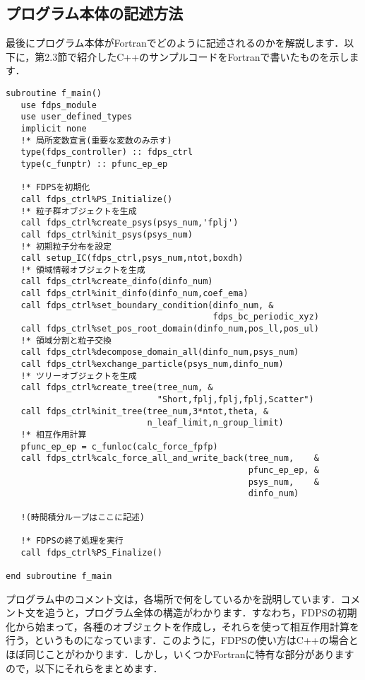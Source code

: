 \documentclass[twocolumn,10pt]{jarticle}
\begin{document}
\subsection{プログラム本体の記述方法}\label{subsec:how_to_implement_main}
最後にプログラム本体がFortranでどのように記述されるのかを解説します．以下に，第2.3節で紹介したC++のサンプルコードをFortranで書いたものを示します．
{\scriptsize
\begin{verbatim}
subroutine f_main()
   use fdps_module
   use user_defined_types
   implicit none
   !* 局所変数宣言(重要な変数のみ示す)
   type(fdps_controller) :: fdps_ctrl
   type(c_funptr) :: pfunc_ep_ep

   !* FDPSを初期化
   call fdps_ctrl%PS_Initialize()
   !* 粒子群オブジェクトを生成
   call fdps_ctrl%create_psys(psys_num,'fplj')
   call fdps_ctrl%init_psys(psys_num)
   !* 初期粒子分布を設定
   call setup_IC(fdps_ctrl,psys_num,ntot,boxdh)
   !* 領域情報オブジェクトを生成
   call fdps_ctrl%create_dinfo(dinfo_num)
   call fdps_ctrl%init_dinfo(dinfo_num,coef_ema)
   call fdps_ctrl%set_boundary_condition(dinfo_num, &
                                         fdps_bc_periodic_xyz)
   call fdps_ctrl%set_pos_root_domain(dinfo_num,pos_ll,pos_ul)
   !* 領域分割と粒子交換
   call fdps_ctrl%decompose_domain_all(dinfo_num,psys_num)
   call fdps_ctrl%exchange_particle(psys_num,dinfo_num)
   !* ツリーオブジェクトを生成
   call fdps_ctrl%create_tree(tree_num, &
                              "Short,fplj,fplj,fplj,Scatter")
   call fdps_ctrl%init_tree(tree_num,3*ntot,theta, &
                            n_leaf_limit,n_group_limit)
   !* 相互作用計算
   pfunc_ep_ep = c_funloc(calc_force_fpfp)
   call fdps_ctrl%calc_force_all_and_write_back(tree_num,    &
                                                pfunc_ep_ep, &
                                                psys_num,    &
                                                dinfo_num)
                                                
   !(時間積分ループはここに記述)

   !* FDPSの終了処理を実行
   call fdps_ctrl%PS_Finalize()

end subroutine f_main                          
\end{verbatim}
}\noindent
プログラム中のコメント文は，各場所で何をしているかを説明しています．コメント文を追うと，プログラム全体の構造がわかります．すなわち，FDPSの初期化から始まって，各種のオブジェクトを作成し，それらを使って相互作用計算を行う，というものになっています．このように，FDPSの使い方はC++の場合とほぼ同じことがわかります．しかし，いくつかFortranに特有な部分がありますので，以下にそれらをまとめます．
\end{document}
